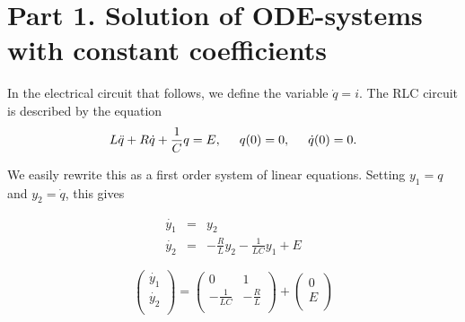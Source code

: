 \section*{Part 1. Solution of ODE-systems with constant coefficients}

In the electrical circuit that follows, we define the variable $\dot{q}=i$.
The RLC circuit is described by the equation
$$L\ddot{q}+R\dot{q}+\frac{1}{C}q = E,\hspace*{5mm}q(0)=0,\hspace*{5mm}\dot{q}(0)=0.$$

We easily rewrite this as a first order system of linear equations. Setting $y_1=q$ and $y_2=\dot{q}$, this gives


$$ \left.\begin{array}{lll}
\dot{y_1} & = & y_2\\
\dot{y_2} & = & -\frac{R}{L}y_2 - \frac{1}{LC}y_1 + E
\end{array}\right. $$

$$\begin{pmatrix}
\dot{y_1}\\
\dot{y_2}\\
\end{pmatrix}= \begin{pmatrix}
0 & 1\\
- \frac{1}{LC} & -\frac{R}{L}\\
\end{pmatrix}
+ \begin{pmatrix}
0\\
E\\
\end{pmatrix}$$
